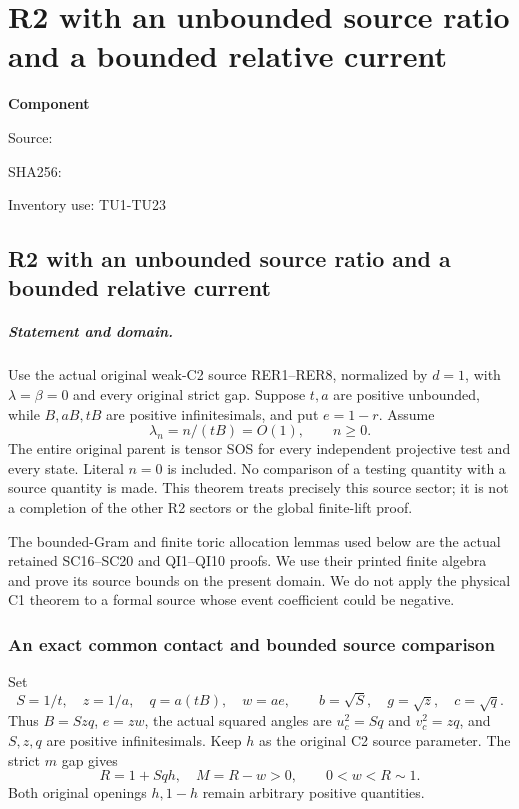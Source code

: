\chapter{R2 with an unbounded source ratio and a bounded relative current}
\label{component:pb88ccd68a4bf}
\noindent\textbf{Component }\par
{\small\noindent Source: \par}
{\small\noindent SHA256: \par}
{\small\noindent Inventory use: TU1-TU23\par}
\medskip
\section{R2 with an unbounded source ratio and a bounded relative current}
\label{pb88ccd68a4bf:sec:r2-thin-new}

\paragraph{Statement and domain.}
Use the actual original weak-C2 source RER1--RER8, normalized by
$d=1$, with $\lambda=\beta=0$ and every original strict gap.
Suppose $t,a$ are positive unbounded, while $B,aB,tB$ are
positive infinitesimals, and put $e=1-r$.  Assume
\[
             \lambda_n=n/(tB)=O(1),\qquad n\geq0.       \tag{TU1}
\]
The entire original parent is tensor SOS for every independent
projective test and every state.  Literal $n=0$ is included.
No comparison of a testing quantity with a source quantity is made.
This theorem treats precisely this source sector; it is not a
completion of the other R2 sectors or the global finite-lift proof.

The bounded-Gram and finite toric allocation lemmas used below are
the actual retained SC16--SC20 and QI1--QI10 proofs.  We use their
printed finite algebra and prove its source bounds on the present
domain.  We do not apply the physical C1 theorem to a formal source
whose event coefficient could be negative.

\subsection{An exact common contact and bounded source comparison}

Set
\[
 S=1/t,\quad z=1/a,\quad q=a(tB),\quad w=ae,\qquad
 b=\sqrt S,\quad g=\sqrt z,\quad c=\sqrt q.
                                                               \tag{TU2}
\]
Thus $B=Szq$, $e=zw$, the actual squared angles are
$u_c^2=Sq$ and $v_c^2=zq$, and $S,z,q$ are positive
infinitesimals.  Keep $h$ as the original C2 source parameter.
The strict $m$ gap gives
\[
 R=1+Sqh,\quad M=R-w>0,
 \qquad 0<w<R\sim1.                                      \tag{TU3}
\]
Both original openings $h,1-h$ remain arbitrary positive quantities.

